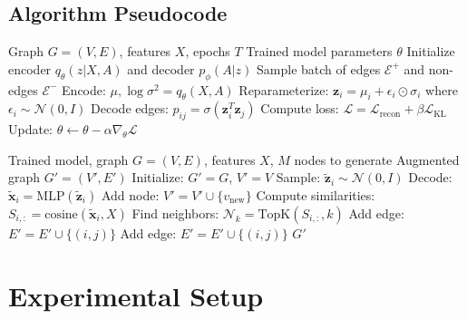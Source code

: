 \documentclass[12pt]{article}
\begin{document}
\subsection{Algorithm Pseudocode}

\begin{algorithm}
\caption{AGN Training}
\begin{algorithmic}[1]
\REQUIRE Graph $G = (V, E)$, features $X$, epochs $T$
\ENSURE Trained model parameters $\theta$
\STATE Initialize encoder $q_\theta(z|X,A)$ and decoder $p_\phi(A|z)$
    \STATE Sample batch of edges $\mathcal{E}^+$ and non-edges $\mathcal{E}^-$
    \STATE Encode: $\mu, \log\sigma^2 = q_\theta(X, A)$
    \STATE Reparameterize: $\mathbf{z}_i = \mu_i + \epsilon_i \odot \sigma_i$ where $\epsilon_i \sim \mathcal{N}(0,I)$
    \STATE Decode edges: $p_{ij} = \sigma(\mathbf{z}_i^T \mathbf{z}_j)$
    \STATE Compute loss: $\mathcal{L} = \mathcal{L}_{\text{recon}} + \beta \mathcal{L}_{\text{KL}}$
    \STATE Update: $\theta \leftarrow \theta - \alpha \nabla_\theta \mathcal{L}$
\ENDFOR
\end{algorithmic}
\end{algorithm}

\begin{algorithm}
\caption{AGN Node Generation and Insertion}
\begin{algorithmic}[1]
\REQUIRE Trained model, graph $G = (V, E)$, features $X$, $M$ nodes to generate
\ENSURE Augmented graph $G' = (V', E')$
\STATE Initialize: $G' = G$, $V' = V$
    \STATE Sample: $\tilde{\mathbf{z}}_i \sim \mathcal{N}(0, I)$
    \STATE Decode: $\tilde{\mathbf{x}}_i = \text{MLP}(\tilde{\mathbf{z}}_i)$
    \STATE Add node: $V' = V' \cup \{v_{\text{new}}\}$
\ENDFOR
{}
    \STATE Compute similarities: $S_{i,:} = \text{cosine}(\tilde{\mathbf{x}}_i, X)$
    \STATE Find neighbors: $\mathcal{N}_k = \text{TopK}(S_{i,:}, k)$
            \STATE Add edge: $E' = E' \cup \{(i, j)\}$
        \ENDIF
    \ENDFOR
\ENDFOR
{}
        \STATE Add edge: $E' = E' \cup \{(i, j)\}$
    \ENDIF
\ENDFOR
\RETURN $G'$
\end{algorithmic}
\end{algorithm}

\section{Experimental Setup}
\end{document}
